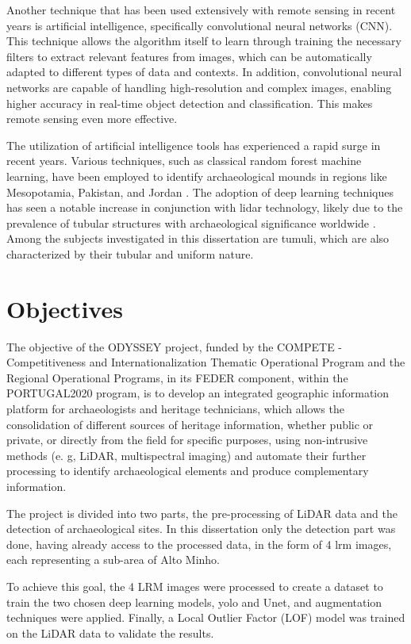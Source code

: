 Another technique that has been used extensively with remote sensing in recent years is artificial intelligence, specifically convolutional neural networks (CNN). This technique allows the algorithm itself to learn through training the necessary filters to extract relevant features from images, which can be automatically adapted to different types of data and contexts. In addition, convolutional neural networks are capable of handling high-resolution and complex images, enabling higher accuracy in real-time object detection and classification. This makes remote sensing even more effective.


The utilization of artificial intelligence tools has experienced a rapid surge in recent years\cite{aumentoexpDL}. Various techniques, such as classical random forest machine learning, have been employed to identify archaeological mounds in regions like Mesopotamia, Pakistan, and Jordan \cite{LIDARCOMDL}. The adoption of deep learning techniques has seen a notable increase in conjunction with \ac{lidar} technology, likely due to the prevalence of tubular structures with archaeological significance worldwide \cite{LIDARCOMDL}. Among the subjects investigated in this dissertation are tumuli, which are also characterized by their tubular and uniform nature.


\section{Objectives}
The objective of the ODYSSEY project, funded by the COMPETE - Competitiveness and Internationalization Thematic Operational Program and the Regional Operational Programs, in its FEDER component, within the PORTUGAL2020 program, is to develop an integrated geographic information platform for archaeologists and heritage technicians, which allows the consolidation of different sources of heritage information, whether public or private, or directly from the field for specific purposes, using non-intrusive methods (e. g, LiDAR, multispectral imaging) and automate their further processing to identify archaeological elements and produce complementary information.

The project is divided into two parts, the pre-processing of LiDAR data and the detection of archaeological sites. In this dissertation only the detection part was done, having already access to the processed data, in the form of 4 \ac{lrm} images, each representing a sub-area of Alto Minho.

To achieve this goal, the 4 LRM images were processed to create a dataset to train the two chosen deep learning models, \ac{yolo} and Unet, and augmentation techniques were applied. Finally, a Local Outlier Factor (LOF) model was trained on the LiDAR data to validate the results.

